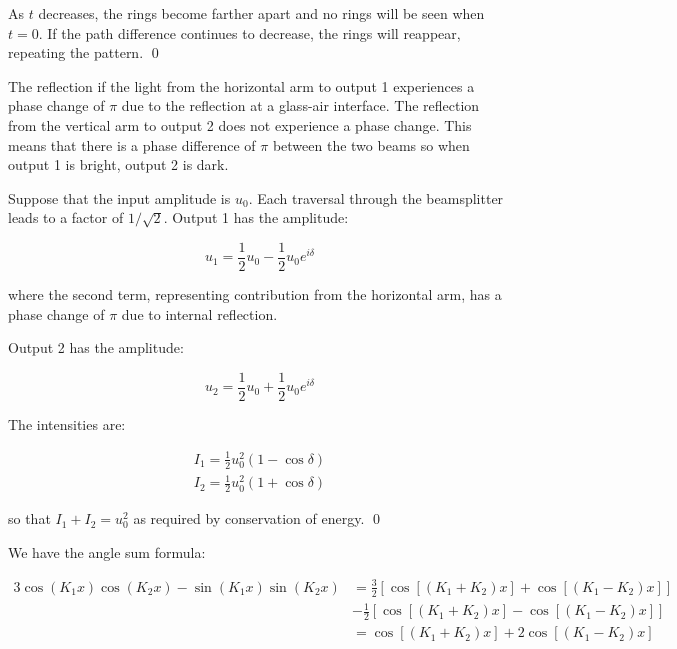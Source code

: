 \documentclass[12pt]{article}
\begin{document}
As $t$ decreases, the rings become farther apart and no rings will be seen when $t = 0$. If the path difference continues to decrease, the rings will reappear, repeating the pattern.
\qed



The reflection if the light from the horizontal arm to output 1 experiences a phase change of $\pi$ due to the reflection at a glass-air interface. The reflection from the vertical arm to output 2 does not experience a phase change. This means that there is a phase difference of $\pi$ between the two beams so when output 1 is bright, output 2 is dark.

Suppose that the input amplitude is $u_{0}$. Each traversal through the beamsplitter leads to a factor of $1/\sqrt{2}$. Output 1 has the amplitude:

\begin{equation}
    u_{1} = \frac{1}{2} u_{0} - \frac{1}{2} u_{0} e^{i \delta}
\end{equation}

where the second term, representing contribution from the horizontal arm, has a phase change of $\pi$ due to internal reflection.

Output 2 has the amplitude:

\begin{equation}
    u_{2} = \frac{1}{2} u_{0} + \frac{1}{2} u_{0} e^{i \delta}
\end{equation}

The intensities are:

\begin{equation}
    \begin{split}
        I_{1} = \frac{1}{2} u_{0}^{2} (1 - \cos{\delta}) \\
        I_{2} = \frac{1}{2} u_{0}^{2} (1 + \cos{\delta})
    \end{split}
\end{equation}

so that $I_{1} + I_{2} = u_{0}^{2}$ as required by conservation of energy.
\qed


We have the angle sum formula:

\begin{equation}
    \begin{split}
        3\cos{(K_{1} x)} \cos{(K_{2} x)} - \sin{(K_{1} x)} \sin{(K_{2} x)} &= \frac{3}{2} \left[ \cos{[(K_{1} + K_{2})x]} + \cos{[(K_{1} - K_{2})x]} \right] \\
        &- \frac{1}{2} \left[ \cos{[(K_{1} + K_{2})x]} - \cos{[(K_{1} - K_{2})x]} \right] \\
        &= \cos{[(K_{1} + K_{2})x]} + 2 \cos{[(K_{1} - K_{2})x]}
    \end{split}
\end{equation}
\end{document}
